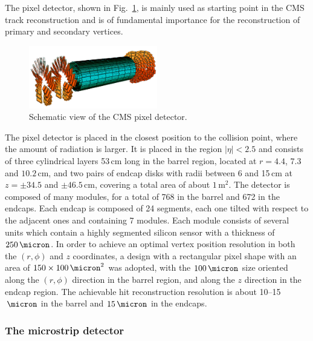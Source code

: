 The pixel detector, shown in Fig.~\ref{fig:pixel}, is mainly used as starting point in the CMS track reconstruction and is of fundamental importance for the reconstruction of primary and secondary vertices. 
\begin{figure}[htb]
\centering
\includegraphics[width=0.5\textwidth]{images/pixel.png}
\caption{Schematic view of the CMS pixel detector.}\label{fig:pixel}
\end{figure}
The pixel detector is placed in the closest position to the collision point, where the amount of radiation is larger. It is placed in the region $|\eta|<2.5$ and consists of three cylindrical layers 53\,cm long in the barrel region, located at $r=4.4$, $7.3$ and $10.2$\,cm, and two pairs of endcap disks with radii between 6 and 15\,cm at $z=\pm34.5$ and $\pm46.5$\,cm, covering a total area of about $1\,\mathrm{m^2}$. The detector is composed of many modules, for a total of 768 in the barrel and 672 in the endcaps. Each endcap is composed of 24 segments, each one tilted with respect to the adjacent ones and containing 7 modules. Each module consists of several units which contain a highly segmented silicon sensor with a thickness of $250\,\micron$. In order to achieve an optimal vertex position resolution in both the $(r,\phi)$ and $z$ coordinates, a design with a rectangular pixel shape with an area of $150\times100\,\micron^2$ was adopted, with the $100\,\micron$ size oriented along the $(r,\phi)$ direction in the barrel region, and along the $z$ direction in the endcap region. The achievable hit reconstruction resolution is about 10--15$\,\micron$ in the barrel and $15\,\micron$ in the endcaps.

\subsubsection{The microstrip detector}

